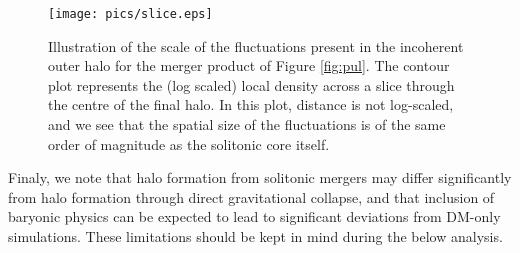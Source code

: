 \documentclass[a4paper,11pt]{article}
\begin{document}
\begin{figure}
\centering
\texttt{[image: pics/slice.eps]}
\caption{Illustration of the scale of the fluctuations present in the incoherent outer halo for the merger product of Figure \ref{fig:pul}. The contour plot represents the (log scaled) local density across a slice through the centre of the final halo. In this plot, distance is not log-scaled, and we see that the spatial size of the fluctuations is of the same order of magnitude as the solitonic core itself.}\label{fig:contour}
\end{figure}


Finaly, we note that halo formation from solitonic mergers may differ significantly from halo formation through direct gravitational collapse, and that inclusion of baryonic physics can be expected to lead to significant deviations from DM-only simulations. These limitations should be kept in mind during the below analysis.
 
\end{document}
